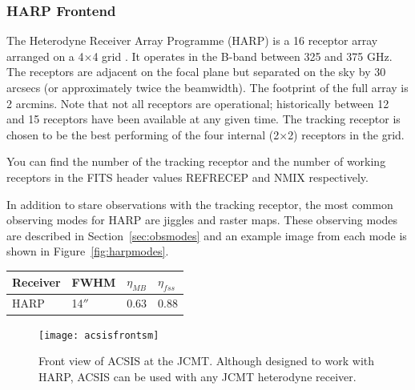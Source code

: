 \documentclass[twoside,11pt]{article}
\newcommand{\htmlref}[2]{#1}
\newcommand{\latexhtml}[2]{#1}
\newcommand{\xlabel}[1]{}
\renewcommand{\_}{\texttt{\symbol{95}}}
\newcommand{\cref}[3]{\latexhtml{#1~\ref{#2}}{\htmlref{#3}{#2}}}
\begin{document}
\subsubsection{\xlabel{harp}HARP Frontend}
The Heterodyne Receiver Array Programme (HARP) is a 16 receptor array arranged on a 4$\times$4 grid \cite{harp}. It operates in the B-band between 325 and 375 GHz. The receptors are adjacent on the focal plane but separated on the sky by 30 arcsecs (or approximately twice the beamwidth). The footprint of the full array is 2 arcmins. Note that not all receptors are operational; historically between 12 and 15 receptors have been available at any given time. The tracking receptor is chosen to be the best performing of the four internal (2$\times$2) receptors in the grid. 

You can find the number of the tracking receptor and the number of working receptors in the FITS header values REFRECEP and N\_MIX respectively.

In addition to stare observations with the tracking receptor, the most common observing modes for HARP are jiggles and raster maps. These observing modes are described in \cref{Section}{sec:obsmodes}{Observing modes} and an example image from each mode is shown in \cref{Figure}{fig:harpmodes}{the figure below}.

\begin{table}[h!]
\begin{center}
\begin{tabular}{|p{1.5cm}|p{1.2cm}|p{0.8cm}|p{0.8cm}|}
\hline
Receiver &FWHM & $\eta_{MB}$ & $\eta_{fss}$\\
\hline
HARP&14$''$ &0.63& 0.88\\
\hline
\end{tabular}
\end{center}
\end{table}


\begin{figure}[b!]
\begin{center}
\texttt{[image: acsis\_front\_sm]}
\caption[Front view of ACSIS at the JCMT]{Front view of ACSIS at the JCMT. Although designed to work with HARP, ACSIS can be used with any JCMT heterodyne receiver.}
\label{fig:acsis}
\end{center}
\end{figure}
\end{document}

